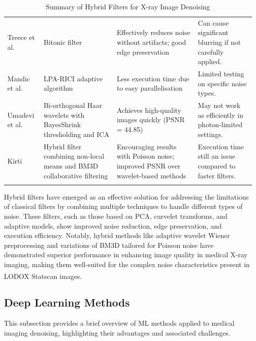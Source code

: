 \begin{center}
\begin{longtable}{ p{}  p{}  p{}  p{} }
\rowcolor[HTML]{F3F3F3} 
Treece et al. \cite{7559744} & Bitonic filter & Effectively reduces noise without artifacts; good edge preservation & Can cause significant blurring if not carefully applied. \\
\rowcolor[HTML]{FFFFFF} 
Mandic et al. \cite{mandic_denoising_2018} & \gls{LPA-RICI} adaptive algorithm & Less execution time due to easy parallelisation & Limited testing on specific noise types. \\
\rowcolor[HTML]{F3F3F3} 
Umadevi et al. \cite{umadevi_improved_2011} & Bi-orthogonal Haar wavelets with BayesShrink thresholding and \gls{ICA} & Achieves high-quality images quickly (PSNR = 44.85) & May not work as efficiently in photon-limited settings. \\
\rowcolor[HTML]{FFFFFF} 
Kirti \cite{kirti_poisson_2017} & Hybrid filter combining non-local means and \gls{BM3D} collaborative filtering & Encouraging results with Poisson noise; improved PSNR over wavelet-based methods & Execution time still an issue compared to faster filters. \\

\caption{Summary of Hybrid Filters for X-ray Image Denoising}
\label{tab:hybrid}
\end{longtable}

\end{center}


 
Hybrid filters have emerged as an effective solution for addressing the limitations of classical filters by combining multiple techniques to handle different types of noise. These filters, such as those based on \gls{PCA}, curvelet transforms, and adaptive models, show improved noise reduction, edge preservation, and execution efficiency. Notably, hybrid methods like adaptive wavelet Wiener preprocessing and variations of \gls{BM3D} tailored for Poisson noise have demonstrated superior performance in enhancing image quality in medical X-ray imaging, making them well-suited for the complex noise characteristics present in LODOX\textsuperscript{\textregistered} Statscan\textsuperscript{\textregistered} images.


\subsection{Deep Learning Methods}
This subsection provides a brief overview of  \gls{ML} methods applied to medical imaging denoising, highlighting their advantages and associated challenges.


